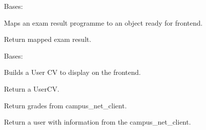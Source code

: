 \documentclass[letterpaper,10pt,english]{sphinxmanual}
\begin{document}
\begin{fulllineitems}
\label{cv_kickstarter.models:cv_kickstarter.models.user_cv_builder.CampusNetExamResultMapper}
Bases: 

Maps an exam result programme to an object ready for frontend.

\begin{fulllineitems}
\label{cv_kickstarter.models:cv_kickstarter.models.user_cv_builder.CampusNetExamResultMapper.mapped_exam_result}
Return mapped exam result.

\end{fulllineitems}


\end{fulllineitems}


\begin{fulllineitems}
\label{cv_kickstarter.models:cv_kickstarter.models.user_cv_builder.UserCVBuilder}
Bases: 

Builds a User CV to display on the frontend.

\begin{fulllineitems}
\label{cv_kickstarter.models:cv_kickstarter.models.user_cv_builder.UserCVBuilder.build}
Return a UserCV.

\end{fulllineitems}


\begin{fulllineitems}
\label{cv_kickstarter.models:cv_kickstarter.models.user_cv_builder.UserCVBuilder.grades}
Return grades from campus\_net\_client.

\end{fulllineitems}


\begin{fulllineitems}
\label{cv_kickstarter.models:cv_kickstarter.models.user_cv_builder.UserCVBuilder.user}
Return a user with information from the campus\_net\_client.

\end{fulllineitems}


\end{fulllineitems}
\end{document}
